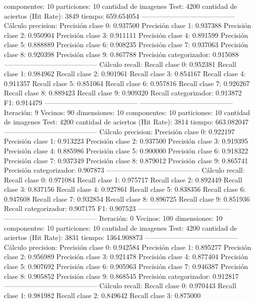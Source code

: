 componentes: 10
particiones: 10
cantidad de imagenes Test: 4200
cantidad de aciertos (Hit Rate): 3849
tiempo: 659.654054
-----------------------------------------
Cálculo precision: 
Precisión clase 0: 0.937500
Precisión clase 1: 0.937388
Precisión clase 2: 0.950904
Precisión clase 3: 0.911111
Precisión clase 4: 0.891599
Precisión clase 5: 0.888889
Precisión clase 6: 0.908235
Precisión clase 7: 0.937063
Precisión clase 8: 0.920398
Precisión clase 9: 0.867788
Precisión categorizador: 0.915088
-----------------------------------------
Cálculo recall: 
Recall clase 0: 0.952381
Recall clase 1: 0.984962
Recall clase 2: 0.901961
Recall clase 3: 0.854167
Recall clase 4: 0.911357
Recall clase 5: 0.851064
Recall clase 6: 0.957816
Recall clase 7: 0.926267
Recall clase 8: 0.889423
Recall clase 9: 0.909320
Recall categorizador: 0.913872
F1: 0.914479
-----------------------------------------
-----------------------------------------
Iteración: 9
Vecinos: 90
dimensiones: 10
componentes: 10
particiones: 10
cantidad de imagenes Test: 4200
cantidad de aciertos (Hit Rate): 3814
tiempo: 663.082047
-----------------------------------------
Cálculo precision: 
Precisión clase 0: 0.922197
Precisión clase 1: 0.913223
Precisión clase 2: 0.937500
Precisión clase 3: 0.919395
Precisión clase 4: 0.885986
Precisión clase 5: 0.900000
Precisión clase 6: 0.918322
Precisión clase 7: 0.937349
Precisión clase 8: 0.879012
Precisión clase 9: 0.865741
Precisión categorizador: 0.907873
-----------------------------------------
Cálculo recall: 
Recall clase 0: 0.971084
Recall clase 1: 0.975717
Recall clase 2: 0.892449
Recall clase 3: 0.837156
Recall clase 4: 0.927861
Recall clase 5: 0.838356
Recall clase 6: 0.947608
Recall clase 7: 0.932854
Recall clase 8: 0.896725
Recall clase 9: 0.851936
Recall categorizador: 0.907175
F1: 0.907523
-----------------------------------------
-----------------------------------------
Iteración: 0
Vecinos: 100
dimensiones: 10
componentes: 10
particiones: 10
cantidad de imagenes Test: 4200
cantidad de aciertos (Hit Rate): 3831
tiempo: 1364.908873
-----------------------------------------
Cálculo precision: 
Precisión clase 0: 0.942584
Precisión clase 1: 0.895277
Precisión clase 2: 0.956989
Precisión clase 3: 0.921478
Precisión clase 4: 0.877404
Precisión clase 5: 0.907692
Precisión clase 6: 0.905963
Precisión clase 7: 0.946387
Precisión clase 8: 0.905852
Precisión clase 9: 0.868545
Precisión categorizador: 0.912817
-----------------------------------------
Cálculo recall: 
Recall clase 0: 0.970443
Recall clase 1: 0.981982
Recall clase 2: 0.849642
Recall clase 3: 0.875000
